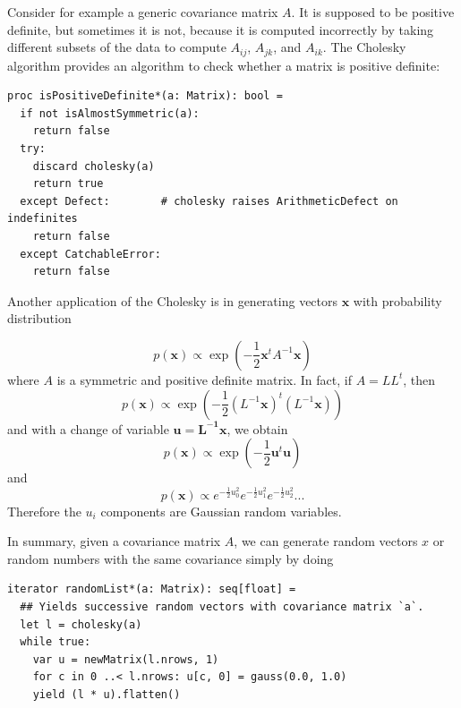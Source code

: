 \documentclass[justified, sixbynine]{tufte-book}
\def\ft{\small\tt}
\theoremstyle{plain}%
\newtheorem * {corollary}{Corollary}
\theoremstyle{definition}
\theoremstyle{remark}
\newtheorem * {remark}{Remark}
\newtheorem * {note}{Note}
\begin{document}
\begin{fullwidth}
Consider for example a generic covariance matrix $A$. It is supposed to be positive definite, but sometimes it is not, because it is computed incorrectly by taking different subsets of the data to compute $A_{ij}$, $A_{jk}$, and $A_{ik}$. The Cholesky algorithm provides an algorithm to check whether a matrix is positive definite:

\begin{lstlisting}[caption={in file: {\ft nlib/linalg.nim}}]
proc isPositiveDefinite*(a: Matrix): bool =
  if not isAlmostSymmetric(a):
    return false
  try:
    discard cholesky(a)
    return true
  except Defect:        # cholesky raises ArithmeticDefect on indefinites
    return false
  except CatchableError:
    return false
\end{lstlisting}

Another application of the Cholesky is in generating vectors $\mathbf{x}$ with probability distribution

\begin{equation}
p(\mathbf{x}) \propto \exp\left(-\frac12 \mathbf{x}^t A^{-1} \mathbf{x}\right)
\end{equation}
where $A$ is a symmetric and positive definite matrix. In fact, if $A=LL^t$, then
\begin{equation}
p(\mathbf{x}) \propto \exp\left(-\frac12 (L^{-1}\mathbf{x})^t (L^{-1}\mathbf{x})\right)
\end{equation}
and with a change of variable $\mathbf{u}=\mathbf{L^{-1}x}$, we obtain
\begin{equation}
p(\mathbf{x}) \propto \exp\left(-\frac12 \mathbf{u}^t \mathbf{u}\right)
\end{equation}
and
\begin{equation}
p(\mathbf{x}) \propto e^{-\frac12 u_0^2}e^{-\frac12 u_1^2}e^{-\frac12 u_2^2}...
\end{equation}
Therefore the $u_i$ components are Gaussian random variables.

In summary, given a covariance matrix $A$, we can generate random vectors $x$ or random numbers with the same covariance simply by doing

\begin{lstlisting}[caption={in file: {\ft nlib/finance.nim}}]
iterator randomList*(a: Matrix): seq[float] =
  ## Yields successive random vectors with covariance matrix `a`.
  let l = cholesky(a)
  while true:
    var u = newMatrix(l.nrows, 1)
    for c in 0 ..< l.nrows: u[c, 0] = gauss(0.0, 1.0)
    yield (l * u).flatten()
\end{lstlisting}


\end{fullwidth}
\end{document}
